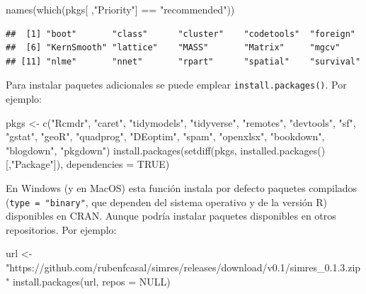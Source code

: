 \documentclass[
]{book}
\newenvironment{Shaded}{\begin{snugshade}}{\end{snugshade}}
\newcommand{\AttributeTok}[1]{\textcolor[rgb]{0.77,0.63,0.00}{#1}}
\newcommand{\ConstantTok}[1]{\textcolor[rgb]{0.00,0.00,0.00}{#1}}
\newcommand{\FunctionTok}[1]{\textcolor[rgb]{0.00,0.00,0.00}{#1}}
\newcommand{\NormalTok}[1]{#1}
\newcommand{\OtherTok}[1]{\textcolor[rgb]{0.56,0.35,0.01}{#1}}
\newcommand{\SpecialCharTok}[1]{\textcolor[rgb]{0.00,0.00,0.00}{#1}}
\newcommand{\StringTok}[1]{\textcolor[rgb]{0.31,0.60,0.02}{#1}}
\theoremstyle{break}
\theoremstyle{nonumberplain}
\begin{document}
\begin{Shaded}
\begin{Highlighting}[]
\FunctionTok{names}\NormalTok{(}\FunctionTok{which}\NormalTok{(pkgs[ ,}\StringTok{"Priority"}\NormalTok{] }\SpecialCharTok{==} \StringTok{"recommended"}\NormalTok{))}
\end{Highlighting}
\end{Shaded}

\begin{verbatim}
##  [1] "boot"       "class"      "cluster"    "codetools"  "foreign"   
##  [6] "KernSmooth" "lattice"    "MASS"       "Matrix"     "mgcv"      
## [11] "nlme"       "nnet"       "rpart"      "spatial"    "survival"
\end{verbatim}

Para instalar paquetes adicionales se puede emplear \texttt{install.packages()}.
Por ejemplo:

\begin{Shaded}
\begin{Highlighting}[]
\NormalTok{pkgs }\OtherTok{\textless{}{-}} \FunctionTok{c}\NormalTok{(}\StringTok{"Rcmdr"}\NormalTok{, }\StringTok{"caret"}\NormalTok{, }\StringTok{"tidymodels"}\NormalTok{, }\StringTok{"tidyverse"}\NormalTok{, }\StringTok{"remotes"}\NormalTok{, }\StringTok{"devtools"}\NormalTok{,}
          \StringTok{"sf"}\NormalTok{, }\StringTok{"gstat"}\NormalTok{, }\StringTok{"geoR"}\NormalTok{, }\StringTok{"quadprog"}\NormalTok{, }\StringTok{"DEoptim"}\NormalTok{, }\StringTok{"spam"}\NormalTok{, }\StringTok{"openxlsx"}\NormalTok{,}
            \StringTok{"bookdown"}\NormalTok{, }\StringTok{"blogdown"}\NormalTok{, }\StringTok{"pkgdown"}\NormalTok{)}
\FunctionTok{install.packages}\NormalTok{(}\FunctionTok{setdiff}\NormalTok{(pkgs, }\FunctionTok{installed.packages}\NormalTok{()[,}\StringTok{"Package"}\NormalTok{]), }\AttributeTok{dependencies =} \ConstantTok{TRUE}\NormalTok{)}
\end{Highlighting}
\end{Shaded}

En Windows (y en MacOS) esta función instala por defecto paquetes compilados (\texttt{type\ =\ "binary"}, que dependen del sistema operativo y de la versión R) disponibles en CRAN.
Aunque podría instalar paquetes disponibles en otros repositorios.
Por ejemplo:

\begin{Shaded}
\begin{Highlighting}[]
\NormalTok{url }\OtherTok{\textless{}{-}} \StringTok{"https://github.com/rubenfcasal/simres/releases/download/v0.1/simres\_0.1.3.zip"}
\FunctionTok{install.packages}\NormalTok{(url, }\AttributeTok{repos =} \ConstantTok{NULL}\NormalTok{)}
\end{Highlighting}
\end{Shaded}
\end{document}

